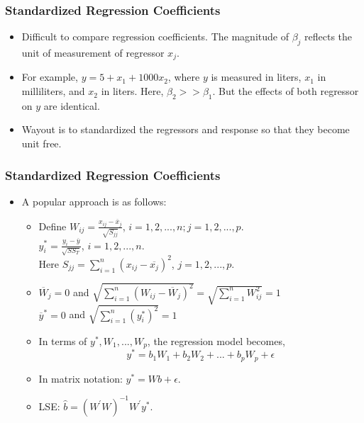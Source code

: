 \documentclass[10pt]{beamer} %
\begin{document}
\begin{frame}
   \frametitle{Standardized Regression Coefficients}
   \begin{itemize}
      \item Difficult to compare regression coefficients. The magnitude of
         $\beta_j$ reflects the unit of measurement of regressor $x_j$.
         \vspace{0.75cm}	
      \item For example, $y=5+x_1+1000x_2$, where $y$ is measured in liters,
         $x_1$ in milliliters, and $x_2$ in liters. Here, $\beta_2>>\beta_1$.
         But the effects of both regressor on $y$ are identical.
         \vspace{0.75cm}		
      \item Wayout is to standardized the regressors and response so that they become unit free.
   \end{itemize}	
\end{frame}

\begin{frame}
   \frametitle{Standardized Regression Coefficients}
   \begin{itemize}
      \item A popular approach is as follows:
         \begin{itemize}
            \item Define $W_{ij}=\frac{x_{ij}-\overline{x}_j}{\sqrt{S_{jj}}}$,
               $i=1,2,...,n;j=1,2,...,p.$ \\
               $y_i^*=\frac{y_i-\overline{y}}{\sqrt{SS_{T}}}$, $i=1,2,...,n.$\\
               Here $S_{jj}=\sum_{i=1}^n(x_{ij}-\overline{x_j})^2$,
               $j=1,2,...,p.$
               \vspace{0.5cm}
            \item $\overline{W}_j=0$ and
               $\sqrt{\sum_{i=1}^n(W_{ij}-\overline{W}_j)^2}=\sqrt{\sum_{i=1}^nW_{ij}^2}=1$
               \\ $\overline{y}^*=0$ and $\sqrt{\sum_{i=1}^n(y_i^*)^2}=1$
               \vspace{0.5cm}
            \item In terms of $y^*,W_1,...,W_p$, the regression model becomes,
               $$y^*=b_1W_1+b_2W_2+...+b_pW_p+\epsilon$$
            \item In matrix notation: ${y}^*=W{b}+{\epsilon}$.
               \vspace{0.5cm}
            \item LSE: $\hat{{b}}=(W^{'}W)^{-1}W^{'}{y}^*$.
         \end{itemize}
   \end{itemize}
\end{frame}
\end{document}
